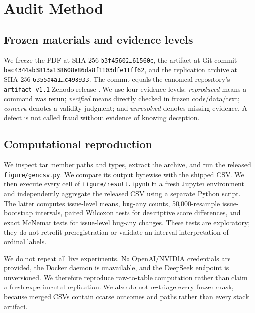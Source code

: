 \documentclass{article}
\begin{document}
\section{Audit Method}
\label{sec:method}

\subsection{Frozen materials and evidence levels}

We freeze the PDF at SHA-256
\texttt{b3f45602\ldots 61560e}, the artifact at Git commit
\texttt{bac4344ab3813a138608e86da8f1103dfe11ff62}, and the replication
archive at SHA-256 \texttt{6355a4a1\ldots c498933}.  The commit equals the
canonical repository's \texttt{artifact-v1.1} Zenodo release
\cite{cleverest_artifact,cleverest_zenodo}.  We use four evidence levels:
\emph{reproduced} means a command was rerun; \emph{verified} means directly
checked in frozen code/data/text; \emph{concern} denotes a validity judgment;
and \emph{unresolved} denotes missing evidence.  A defect is not called fraud
without evidence of knowing deception.

\subsection{Computational reproduction}

We inspect tar member paths and types, extract the archive, and run the released
\texttt{figure/gencsv.py}.  We compare its output bytewise with the shipped
CSV.  We then execute every cell of \texttt{figure/result.ipynb} in a fresh
Jupyter environment and independently aggregate the released CSV using a
separate Python script.  The latter computes issue-level means, bug-any counts,
50,000-resample issue-bootstrap intervals, paired Wilcoxon tests for descriptive
score differences, and exact McNemar tests for issue-level bug-any changes.
These tests are exploratory; they do not retrofit preregistration or validate an
interval interpretation of ordinal labels.

We do not repeat all live experiments.  No OpenAI/NVIDIA credentials are
provided, the Docker daemon is unavailable, and the DeepSeek endpoint is
unversioned.  We therefore reproduce raw-to-table computation rather than claim
a fresh experimental replication.  We also do not re-triage every fuzzer crash,
because merged CSVs contain coarse outcomes and paths rather than every stack
artifact.
\end{document}
